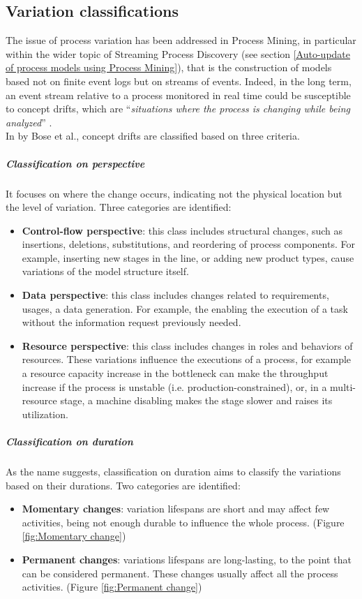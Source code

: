 \subsection{Variation classifications}
The issue of process variation has been addressed in Process Mining, in particular within the wider topic of Streaming Process Discovery (see section \ref{Auto-update of process models using Process Mining}), that is the construction of models based not on finite event logs but on streams of events. Indeed, in the long term, an event stream relative to a process monitored in real time could be susceptible to concept drifts, which are “\textit{situations where the process is changing while being analyzed}” \cite{Aalst16}. \\
In \cite{BoseR.P.J.C.2011Hcdi} by Bose et al., concept drifts are classified based on three criteria. 
\subparagraph{Classification on perspective} It focuses on where the change occurs, indicating not the physical location but the level of variation. Three categories are identified:
\begin{itemize}
\item \textbf{Control-flow perspective}: this class includes structural changes, such as insertions, deletions, substitutions, and reordering of process components. For example, inserting new stages in the line, or adding new product types, cause variations of the model structure itself. 
\item \textbf{Data perspective}: this class includes changes related to requirements, usages, a data generation. For example, the enabling the execution of a task without the information request previously needed. 
\item \textbf{Resource perspective}: this class includes changes in roles and behaviors of resources. These variations influence the executions of a process, for example a resource capacity increase in the bottleneck can make the throughput increase if the process is unstable (i.e. production-constrained), or, in a multi-resource stage, a machine disabling makes the stage slower and raises its utilization.
\end{itemize}
\subparagraph{Classification on duration} As the name suggests, classification on duration aims to classify the variations based on their durations. Two categories are identified:
\begin{itemize}
\item \textbf{Momentary changes}: variation lifespans are short and may affect few activities, being not enough durable to influence the whole process. (Figure \ref{fig:Momentary change})
\item \textbf{Permanent changes}: variations lifespans are long-lasting, to the point that can be considered permanent. These changes usually affect all the process activities. (Figure \ref{fig:Permanent change})
\end{itemize}
